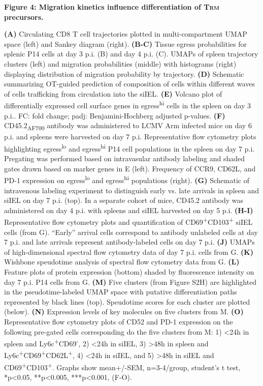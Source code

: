 
\textbf{Figure 4: Migration kinetics influence differentiation of
T\textsc{rm} precursors. }

\textbf{(A)} Circulating CD8 T cell trajectories plotted in
multi-compartment UMAP space (left) and Sankey diagram (right).
\textbf{(B-C)} Tissue egress probabilities for splenic P14 cells at day
3 p.i. (B) and day 4 p.i. (C). UMAPs of spleen trajectory clusters
(left) and migration probabilities (middle) with histograms (right)
displaying distribution of migration probability by trajectory.
\textbf{(D)} Schematic summarizing OT-guided prediction of composition
of cells within different waves of cells trafficking from circulation
into the siIEL. \textbf{(E)} Volcano plot of differentially expressed
cell surface genes in egress\textsuperscript{hi} cells in the spleen on
day 3 p.i.. FC: fold change; padj: Benjamini-Hochberg adjusted p-values.
\textbf{(F)} CD45.2\textsubscript{AF700} antibody was administered to
LCMV Arm infected mice on day 6 p.i. and spleens were harvested on day 7
p.i. Representative flow cytometry plots highlighting
egress\textsuperscript{lo} and egress\textsuperscript{hi} P14 cell
populations in the spleen on day 7 p.i. Pregating was performed based on
intravasular antibody labeling and shaded gates drawn based on marker
genes in E (left). Frequency of CCR9, CD62L, and PD-1 expression on
egress\textsuperscript{lo} and egress\textsuperscript{hi} populations
(right). \textbf{(G)} Schematic of intravenous labeling experiment to
distinguish early vs. late arrivals in spleen and siIEL on day 7 p.i.
(top). In a separate cohort of mice, CD45.2 antibody was administered on
day 4 p.i. with spleens and siIEL harvested on day 5 p.i. \textbf{(H-I)}
Representative flow cytometry plots and quantification of
CD69\textsuperscript{+}CD103\textsuperscript{+} siIEL cells (from G).
``Early'' arrival cells correspond to antibody unlabeled cells at day 7
p.i. and late arrivals represent antibody-labeled cells on day 7 p.i.
\textbf{(J)} UMAPs of high-dimensional spectral flow cytometry data of
day 7 p.i. cells from G. \textbf{(K)} Wishbone speudotime analysis of
spectral flow cytometry data from G. \textbf{(L)} Feature plots of
protein expression (bottom) shaded by fluorescence intensity on day 7
p.i. P14 cells from G. \textbf{(M)} Five clusters (from Figure S2H) are
highlighted in the pseudotime-labeled UMAP space with putative
differentiation paths represented by black lines (top). Speudotime
scores for each cluster are plotted (below). \textbf{(N)} Expression
levels of key molecules on five clusters from M. \textbf{(O)}
Representative flow cytometry plots of CD52 and PD-1 expression on the
following pre-gated cells corresponding do the five clusters from M: 1)
\textless{}24h in spleen and
Ly6c\textsuperscript{+}CD69\textsuperscript{-}, 2) \textless{}24h in
siIEL, 3) \textgreater{}48h in spleen and
Ly6c\textsuperscript{+}CD69\textsuperscript{+}CD62L\textsuperscript{+},
4) \textless{}24h in siIEL, and 5) \textgreater{}48h in siIEL and
CD69\textsuperscript{+}CD103\textsuperscript{+}. Graphs show mean+/-SEM,
n=3-4/group, student's t test, *p\textless{}0.05, **p\textless{}0.005,
***p\textless{}0.001, (F-O).


